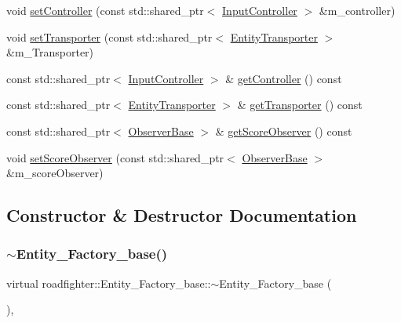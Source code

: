\begin{DoxyCompactItemize}
void \hyperlink{classroadfighter_1_1Entity__Factory__base_a6c9363d763f34f39a44eaf02c6cb9f87}{set\+Controller} (const std\+::shared\+\_\+ptr$<$ \hyperlink{classroadfighter_1_1InputController}{Input\+Controller} $>$ \&m\+\_\+controller)
\item 
void \hyperlink{classroadfighter_1_1Entity__Factory__base_ab3338a586002c58ad7581e1046be9ba5}{set\+Transporter} (const std\+::shared\+\_\+ptr$<$ \hyperlink{classroadfighter_1_1EntityTransporter}{Entity\+Transporter} $>$ \&m\+\_\+\+Transporter)
\item 
const std\+::shared\+\_\+ptr$<$ \hyperlink{classroadfighter_1_1InputController}{Input\+Controller} $>$ \& \hyperlink{classroadfighter_1_1Entity__Factory__base_a3ea098a47127d87d64a6a8623035007a}{get\+Controller} () const
\item 
const std\+::shared\+\_\+ptr$<$ \hyperlink{classroadfighter_1_1EntityTransporter}{Entity\+Transporter} $>$ \& \hyperlink{classroadfighter_1_1Entity__Factory__base_a4a8d467738722cfb4f343de72a4a355a}{get\+Transporter} () const
\item 
const std\+::shared\+\_\+ptr$<$ \hyperlink{classroadfighter_1_1ObserverBase}{Observer\+Base} $>$ \& \hyperlink{classroadfighter_1_1Entity__Factory__base_a7b45161be0cda25b24375f6e99594bcc}{get\+Score\+Observer} () const
\item 
void \hyperlink{classroadfighter_1_1Entity__Factory__base_a59240ab3a76f6d54b051bc560b6d3aa1}{set\+Score\+Observer} (const std\+::shared\+\_\+ptr$<$ \hyperlink{classroadfighter_1_1ObserverBase}{Observer\+Base} $>$ \&m\+\_\+score\+Observer)
\end{DoxyCompactItemize}


\subsection{Constructor \& Destructor Documentation}
\mbox{\label{classroadfighter_1_1Entity__Factory__base_a19ec21ceb4fd132712ef1bf131b4be9b}} 
\subsubsection{\texorpdfstring{$\sim$\+Entity\+\_\+\+Factory\+\_\+base()}{~Entity\_Factory\_base()}}
{\footnotesize\ttfamily virtual roadfighter\+::\+Entity\+\_\+\+Factory\+\_\+base\+::$\sim$\+Entity\+\_\+\+Factory\+\_\+base (\begin{DoxyParamCaption}{ }\end{DoxyParamCaption})\hspace{0.3cm}{\ttfamily [virtual]}, {\ttfamily [default]}}

